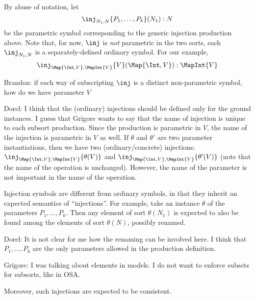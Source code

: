 \documentclass{article}
\newcommand\comment[2]{\par\noindent\color{red}#1: #2\color{black}\par\noindent}
\newcommand\dl{\comment{Dorel}}
\newcommand\gr{\comment{Grigore}}
\theoremstyle{definition}
\theoremstyle{definition}
\theoremstyle{definition}
\theoremstyle{definition}
\theoremstyle{theorem}
\theoremstyle{theorem}
\theoremstyle{theorem}
\theoremstyle{theorem}
\theoremstyle{theorem}
\begin{document}
By abuse of notation, let
\[\inj_{N_1,N}\{P_1,\ldots,P_k\}(N_1):N\]
be the parametric symbol corresponding to the generic injection
production above.
Note that, for now, \(\inj\) is \emph{not} parametric in the two sorts,
each \(\inj_{N_1,N}\) is a separately-defined ordinary symbol.
For our example,
\[\inj_{\Map{\Int,V},\MapInt{V}}\{V\}(\Map{\Int,V}): \MapInt{V}\]
\comment{Brandon}{if each way of subscripting \(\inj\) is a distinct non-parametric
symbol, how do we have parameter \(V\) }
\dl{I think that the (ordinary) injections should be defined only for the ground instances. I guess that Grigore wants to say that the name of injection is unique to each subsort production. Since the production is parametric in $V$, the name of the injection is parametric in $V$ as well. 
If $\theta$ and $\theta'$ are two parameter instantiations, then we have two (ordinary/concrete) injections: $\inj_{\Map{\Int,V},\MapInt{V}}\{\theta(V)\}$ and $\inj_{\Map{\Int,V},\MapInt{V}}\{\theta'(V)\}$ (note that the name of the operation is unchanged).
However, the name of the parameter is not important in the name of the operation.
}

Injection symbols are different from ordinary symbols, in that they
inherit an expected semantics of ``injections''.
For example, take an instance \(\theta\) of the parameters
\(P_1,\ldots,P_k\).
Then any element of sort \(\theta(N_1)\) is expected to also be found
among the elements of sort \(\theta(N)\), possibly renamed.
\dl{It is not clear for me how the renaming can be involved here. I think that \(P_1,\ldots,P_k\) are the only parameters allowed in the production definition.}
\gr{I was talking about elements in models.  I do not want to enforce subsets for subsorts, like in OSA.}
Moreover, such injections are expected to be consistent.
\end{document}
